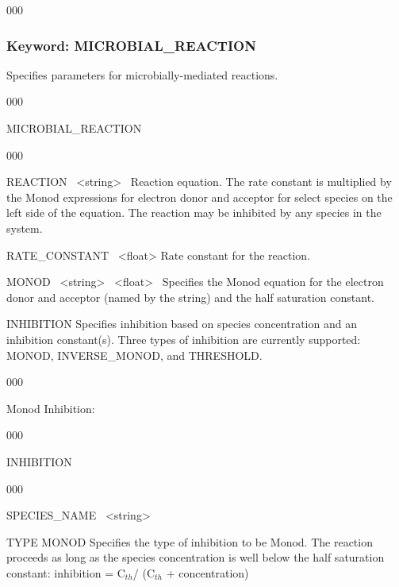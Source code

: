 \begin{deflist}{000}
\hfill\hyperlink{target_key}{\return}

\clearpage
\protect\hypertarget{target_chem_micro}{}
\subsubsection{Keyword: MICROBIAL\_REACTION}
Specifies parameters for microbially-mediated reactions.

\hfill\hyperlink{target_key}{\return}

\begin{deflist}{000}
\item[MICROBIAL\_REACTION] ~

\begin{deflist}{000}
  \item [REACTION] \ <string> \ Reaction equation. The rate constant is multiplied by the Monod expressions for electron donor and acceptor for select species on the left side of the equation. The reaction may be inhibited by any species in the system.

  \item [RATE\_CONSTANT] \ <float>
Rate constant for the reaction.


  \item [MONOD] \ <string> \ <float> \ 
Specifies the Monod equation for the electron donor and acceptor (named by the string) and the half saturation constant.

  \item [INHIBITION] Specifies inhibition based on species concentration and an inhibition constant(s). Three types of inhibition are currently supported: MONOD, \linebreak INVERSE\_MONOD, and THRESHOLD.

  \begin{deflist}{000}
    \item [Monod Inhibition:] ~

    \begin{deflist}{000}
      \item [INHIBITION] ~
      \begin{deflist}{000}
        \item [SPECIES\_NAME] \ <string>
        \item [TYPE MONOD] Specifies the type of inhibition to be Monod. The reaction proceeds as long as the species concentration is well below the half saturation constant: inhibition = C$_{th}$/ (C$_{th}$ + concentration)


\end{deflist}
\end{deflist}
\end{deflist}
\end{deflist}
\end{deflist}
\end{deflist}
